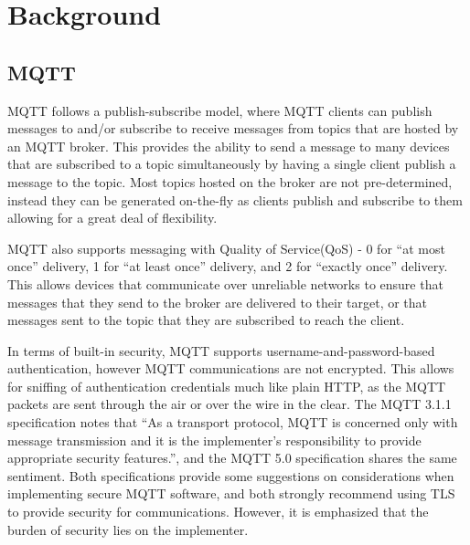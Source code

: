 \documentclass[12pt]{article}
\begin{document}
\section{Background}
\subsection{MQTT}
MQTT follows a publish-subscribe model, where MQTT clients can publish messages to and/or subscribe to receive messages from topics that are hosted by an MQTT broker. This provides the ability to send a message to many devices that are subscribed to a topic simultaneously by having a single client publish a message to the topic. Most topics hosted on the broker are not pre-determined, instead they can be generated on-the-fly as clients publish and subscribe to them allowing for a great deal of flexibility.\par
MQTT also supports messaging with Quality of Service(QoS) - 0 for ``at most once'' delivery, 1 for ``at least once'' delivery, and 2 for ``exactly once'' delivery. This allows devices that communicate over unreliable networks to ensure that messages that they send to the broker are delivered to their target, or that messages sent to the topic that they are subscribed to reach the client.\par
In terms of built-in security, MQTT supports username-and-password-based authentication, however MQTT communications are not encrypted. This allows for sniffing of authentication credentials much like plain HTTP, as the MQTT packets are sent through the air or over the wire in the clear. The MQTT 3.1.1 specification notes that ``As a transport protocol, MQTT is concerned only with message transmission and it is the implementer’s responsibility to provide appropriate security features.''\cite{mqtt3.1.1}, and the MQTT 5.0 specification shares the same sentiment\cite{mqtt5.0}. Both specifications provide some suggestions on considerations when implementing secure MQTT software, and both strongly recommend using TLS to provide security for communications. However, it is emphasized that the burden of security lies on the implementer. 
\end{document}
